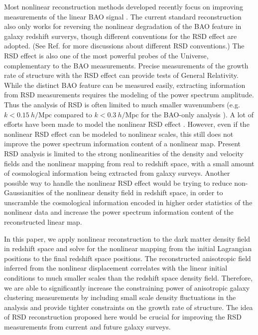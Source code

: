 \documentclass[aps,prd,twocolumn,superscriptaddress,groupedaddress,nofootinbib,amsfont]{revtex4}  %
\newcommand{\mr}{\mathrm}
\begin{document}
Most nonlinear reconstruction methods developed recently focus on improving 
measurements of the linear BAO signal \cite{2016HMZ,2017Marcel,2017Shi,2017US}.
The current standard reconstruction also only works for reversing the nonlinear
degradation of the BAO feature in galaxy redshift surverys, though different
conventions for the RSD effect are adopted. (See Ref. \cite{2016Seo} for more
discussions about different RSD conventions.) 
The RSD effect is also one of the most powerful probes of the Universe, 
complementary to the BAO measurements. Precise measurements of the growth rate
of structure with the RSD effect can provide tests of General Relativity. 
While the distinct BAO feature can be measured easily, extracting information
from RSD measurements requires the modeling of the power spectrum amplitude.
Thus the analysis of RSD is often limited to much smaller wavenumbers
(e.g. $k<0.15\ h/\mr{Mpc}$ compared to $k<0.3\ h/\mr{Mpc}$ for the BAO-only
analysis \cite{2017F,2017F2}).
A lot of efforts have been made to model the nonlinear RSD effect \cite{1995F,1998H,2001W,2001S,2002K,2004S,2006T,2007T,2010D,2010TNS,2011M,2011O,2011O2,2011S,2011J,2011GSM,2011DF,2012O,2012O2,2012K,2013Z,2013Z2,2014I,2015W,2015B,2016B,2016J,2017H}.
However, even if the nonlinear RSD effect can be modeled to nonlinear scales,
this still does not improve the power spectrum information content of a 
nonlinear map.
Present RSD analysis is limited to the strong nonlinearities of the density 
and velocity fields and the nonlinear mapping from real to redshift space, with
a small amount of cosmological information being extracted from galaxy surveys.
Another possible way to handle the nonlinear RSD effect would be trying to 
reduce non-Gaussianities of the nonlinear density field in redshift space,
in order to unscramble the cosmological information encoded in higher order 
statistics of the nonlinear data and increase the power spectrum information 
content of the reconstructed linear map.

In this paper, we apply nonlinear reconstruction to the dark matter density 
field in redshift space and solve for the nonlinear mapping from the initial 
Lagrangian positions to the final redshift space positions.
The reconstructed anisotropic field inferred from the nonlinear 
displacement correlates with the linear initial conditions to much smaller
scales than the redshift space density field.
Therefore, we are able to significantly increase the constraining power of 
anisotropic galaxy clustering measurements by including small scale density
fluctuations in the analysis and provide tighter constraints
on the growth rate of structure.
The idea of RSD reconstruction proposed here would be crucial for improving
the RSD measurements from current and future galaxy surveys.
\end{document}
